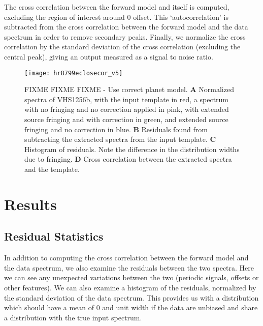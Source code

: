The cross correlation between the forward model and itself is computed, excluding the region of interest around 0 offset. 
This `autocorrelation' is subtracted from the cross correlation between the forward model and the data spectrum in order to remove secondary peaks.
Finally, we normalize the cross correlation by the standard deviation of the cross correlation (excluding the central peak), giving an output measured as a signal to noise ratio.
\begin{figure}[h]
	\texttt{[image: hr8799eclosecor\_v5]}
	\caption{FIXME FIXME FIXME - Use correct planet model. \textbf{A} Normalized spectra of VHS1256b, with the input template in red, a spectrum with no fringing and no correction applied in pink, with extended source fringing and with correction in green, and extended source fringing and no correction in blue. \textbf{B} Residuals found from subtracting the extracted spectra from the input template. \textbf{C} Histogram of residuals. Note the difference in the distribution widths due to fringing. \textbf{D} Cross correlation between the extracted spectra and the template.}
	\label{fig:CrossCor1D}	
\end{figure}

\section{Results}

\subsection{Residual Statistics}
In addition to computing the cross correlation between the forward model and the data spectrum, we also examine the residuals between the two spectra.
Here we can see any unexpected variations between the two (periodic signals, offsets or other features).
We can also examine a histogram of the residuals, normalized by the standard deviation of the data spectrum.
This provides us with a  distribution which should have a mean of 0 and unit width if the data are unbiased and share a distribution with the true input spectrum.

